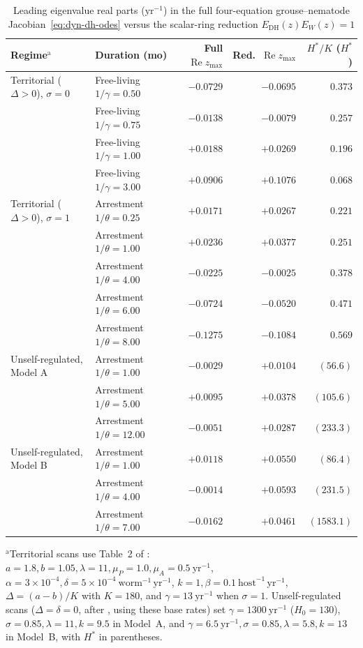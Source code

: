 \begin{table}[ht]
\caption{Leading eigenvalue real parts ($\mathrm{yr}^{-1}$) in the full four-equation grouse--nematode Jacobian~\eqref{eq:dyn-dh-odes} versus the scalar-ring reduction $E_{\mathrm{DH}}(z)E_W(z) = 1$}\label{tab:dyn-grouse}
\footnotesize
\begin{tabular*}{\textwidth}{@{\extracolsep\fill}llrrr@{}}
\toprule
Regime$^{\mathrm{a}}$ & Duration (mo) & Full $\operatorname{Re} z_{\max}$ & Red.\ $\operatorname{Re} z_{\max}$ & $H^*/K$ ($H^*$) \\
\midrule
Territorial ($\Delta > 0$), $\sigma = 0$ & Free-living $1/\gamma = 0.50$ & $-0.0729$ & $-0.0695$ & $0.373$ \\
 & Free-living $1/\gamma = 0.75$ & $-0.0138$ & $-0.0079$ & $0.257$ \\
 & Free-living $1/\gamma = 1.00$ & $+0.0188$ & $+0.0269$ & $0.196$ \\
 & Free-living $1/\gamma = 3.00$ & $+0.0906$ & $+0.1076$ & $0.068$ \\
Territorial ($\Delta > 0$), $\sigma = 1$ & Arrestment $1/\theta = 0.25$ & $+0.0171$ & $+0.0267$ & $0.221$ \\
 & Arrestment $1/\theta = 1.00$ & $+0.0236$ & $+0.0377$ & $0.251$ \\
 & Arrestment $1/\theta = 4.00$ & $-0.0225$ & $-0.0025$ & $0.378$ \\
 & Arrestment $1/\theta = 6.00$ & $-0.0724$ & $-0.0520$ & $0.471$ \\
 & Arrestment $1/\theta = 8.00$ & $-0.1275$ & $-0.1084$ & $0.569$ \\
Unself-regulated, Model A & Arrestment $1/\theta = 1.00$ & $-0.0029$ & $+0.0104$ & $(56.6)$ \\
 & Arrestment $1/\theta = 5.00$ & $+0.0095$ & $+0.0378$ & $(105.6)$ \\
 & Arrestment $1/\theta = 12.00$ & $-0.0051$ & $+0.0287$ & $(233.3)$ \\
Unself-regulated, Model B & Arrestment $1/\theta = 1.00$ & $+0.0118$ & $+0.0550$ & $(86.4)$ \\
 & Arrestment $1/\theta = 4.00$ & $-0.0014$ & $+0.0593$ & $(231.5)$ \\
 & Arrestment $1/\theta = 7.00$ & $-0.0162$ & $+0.0461$ & $(1583.1)$ \\
\bottomrule
\end{tabular*}
\par\smallskip\noindent\footnotesize
$^{\mathrm{a}}$Territorial scans use Table~2 of \citet{dobson1992}: $a = 1.8, b = 1.05, \lambda = 11, \mu_P = 1.0, \mu_A = 0.5\ \mathrm{yr}^{-1}$, $\alpha = 3 \times 10^{-4}, \delta = 5 \times 10^{-4}\ \mathrm{worm}^{-1}\,\mathrm{yr}^{-1}$, $k = 1, \beta = 0.1\ \mathrm{host}^{-1}\,\mathrm{yr}^{-1}$, $\Delta = (a - b)/K$ with $K = 180$, and $\gamma = 13\ \mathrm{yr}^{-1}$ when $\sigma = 1$. Unself-regulated scans ($\Delta = \delta = 0$, after \citealp{gaba2008}, using these base rates) set $\gamma = 1300\ \mathrm{yr}^{-1}$ ($H_0 = 130$), $\sigma = 0.85, \lambda = 11, k = 9.5$ in Model~A, and $\gamma = 6.5\ \mathrm{yr}^{-1}, \sigma = 0.85, \lambda = 5.8, k = 13$ in Model~B, with $H^*$ in parentheses.
\end{table}

